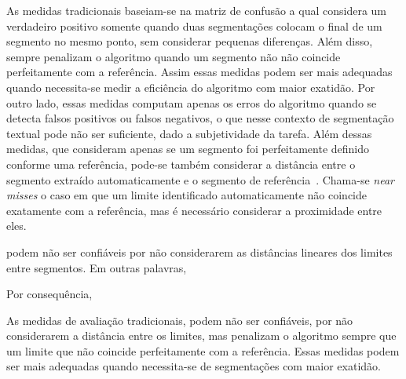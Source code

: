 


















As medidas tradicionais baseiam-se na matriz de confusão a qual considera um verdadeiro positivo somente quando duas segmentações colocam o final de um segmento no mesmo ponto, sem considerar pequenas diferenças. Além disso, sempre penalizam o algoritmo quando um segmento não não coincide perfeitamente com a referência. Assim essas medidas podem ser mais adequadas quando necessita-se medir a eficiência do algoritmo com maior exatidão. 
Por outro lado, essas medidas computam apenas os erros do algoritmo quando se detecta falsos positivos ou falsos negativos, o que nesse contexto de segmentação textual pode não ser suficiente, dado a subjetividade da tarefa. 
%
Além dessas medidas, que consideram apenas se um segmento foi perfeitamente definido conforme uma referência, pode-se também considerar a distância entre o segmento extraído automaticamente e o segmento de referência~\cite{Kern2009}. Chama-se \textit{near misses} o caso em que um limite identificado automaticamente não coincide exatamente com a referência, mas é necessário considerar a proximidade entre eles.





















podem não ser confiáveis por não considerarem as distâncias lineares dos limites entre segmentos.
Em outras palavras, 



Por consequência, 






As medidas de avaliação tradicionais, podem não ser confiáveis, por não considerarem a distância entre os limites, mas penalizam o algoritmo sempre que um limite que não coincide perfeitamente com a referência. Essas medidas podem ser mais adequadas quando necessita-se de segmentações com maior exatidão. 






